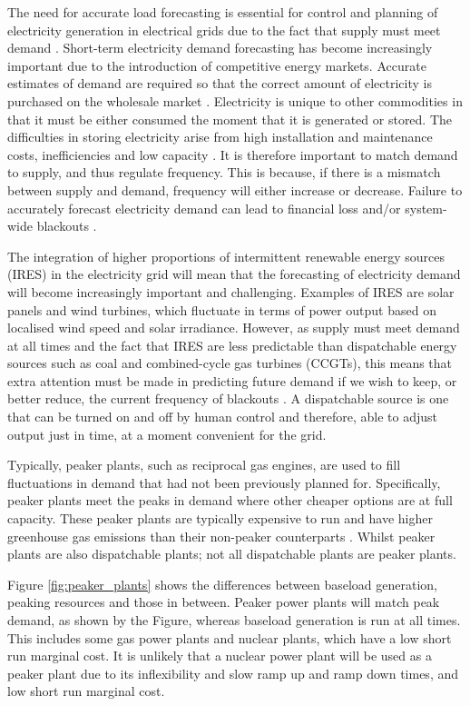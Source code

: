 The need for accurate load forecasting is essential for control and planning of electricity generation in electrical grids due to the fact that supply must meet demand \cite{Lu1993}. Short-term electricity demand forecasting has become increasingly important due to the introduction of competitive energy markets. Accurate estimates of demand are required so that the correct amount of electricity is purchased on the wholesale market \cite{Dillon1991}. Electricity is unique to other commodities in that it must be either consumed the moment that it is generated or stored. The difficulties in storing electricity arise from high installation and maintenance costs, inefficiencies and low capacity \cite{Poonpun2008}. It is therefore important to match demand to supply, and thus regulate frequency. This is because, if there is a mismatch between supply and demand, frequency will either increase or decrease. Failure to accurately forecast electricity demand can lead to financial loss and/or system-wide blackouts \cite{Hines2008}.


The integration of higher proportions of intermittent renewable energy sources (IRES) in the electricity grid will mean that the forecasting of electricity demand will become increasingly important and challenging. Examples of IRES are solar panels and wind turbines, which fluctuate in terms of power output based on localised wind speed and solar irradiance. However, as supply must meet demand at all times and the fact that IRES are less predictable than dispatchable energy sources such as coal and combined-cycle gas turbines (CCGTs), this means that extra attention must be made in predicting future demand if we wish to keep, or better reduce, the current frequency of blackouts \cite{Lu1993}. A dispatchable source is one that can be turned on and off by human control and therefore, able to adjust output just in time, at a moment convenient for the grid.



Typically, peaker plants, such as reciprocal gas engines, are used to fill fluctuations in demand that had not been previously planned for. Specifically, peaker plants meet the peaks in demand where other cheaper options are at full capacity. These peaker plants are typically expensive to run and have higher greenhouse gas emissions than their non-peaker counterparts \cite{Mahmood2014}. Whilst peaker plants are also dispatchable plants; not all dispatchable plants are peaker plants. 

Figure \ref{fig:peaker_plants} shows the differences between baseload generation, peaking resources and those in between. Peaker power plants will match peak demand, as shown by the Figure, whereas baseload generation is run at all times. This includes some gas power plants and nuclear plants, which have a low short run marginal cost. It is unlikely that a nuclear power plant will be used as a peaker plant due to its inflexibility and slow ramp up and ramp down times, and low short run marginal cost. 

